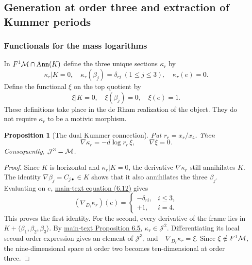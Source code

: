 \documentclass[11pt,a4paper,oneside]{article}
\theoremstyle{plain}
\newtheorem{proposition}[theorem]{Proposition}
\theoremstyle{definition}
\theoremstyle{remark}
\numberwithin{equation}{section}
\newcommand{\otherref}[2]{\href{#1.pdf}{#2}}
\begin{document}
\subsection{Generation at order three and extraction of Kummer periods}
\subsubsection{Functionals for the mass logarithms}
In $F^1\mathcal M\cap\operatorname{Ann}(K)$ define the three unique sections $\kappa_r$ by
\begin{equation}\label{deriv:eq:kappa}
 \kappa_r|K=0,\quad \kappa_r(\beta_j)=\delta_{rj}\ (1\le j\le3),
 \quad \kappa_r(e)=0.
\end{equation}
Define the functional $\xi$ on the top quotient by
\begin{equation}\label{deriv:eq:xi}
 \xi|K=0,\quad\xi(\beta_j)=0,\quad\xi(e)=1.
\end{equation}
These definitions take place in the de Rham realization of the object. They do not require $\kappa_r$ to be a motivic morphism.

\begin{proposition}[The dual Kummer connection]\label{deriv:prop:kummer}
Put $r_r=x_r/x_4$. Then
\begin{equation}\label{deriv:eq:kummerconnection}
 \nabla\kappa_r=-d\log r_r\,\xi,\qquad \nabla\xi=0.
\end{equation}
Consequently, $\mathcal J^3=\mathcal M$.
\end{proposition}
\begin{proof}
Since $K$ is horizontal and $\kappa_r|K=0$, the derivative $\nabla\kappa_r$ still annihilates $K$. The identity $\nabla\beta_j=C_{j\bullet}\in K$ shows that it also annihilates the three $\beta_j$. Evaluating on $e$, \otherref{feynman_periods_long_paper_en}{main-text equation (6.12)} gives
\[
 (\nabla_{D_i}\kappa_r)(e)=
 \begin{cases}-\delta_{ri},&i\le3,\\+1,&i=4.\end{cases}
\]
This proves the first identity. For the second, every derivative of the frame lies in $K+\langle\beta_1,\beta_2,\beta_3\rangle$. By \otherref{feynman_periods_long_paper_en}{main-text Proposition 6.5}, $\kappa_r\in\mathcal J^2$. Differentiating its local second-order expression gives an element of $\mathcal J^3$, and $-\nabla_{D_r}\kappa_r=\xi$. Since $\xi\notin F^1\mathcal M$, the nine-dimensional space at order two becomes ten-dimensional at order three.
\end{proof}
\end{document}
